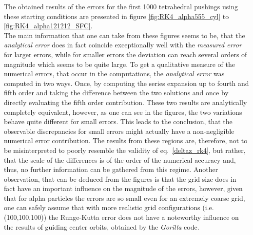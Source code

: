\documentclass[./main.tex]{subfiles}
\begin{document}
The obtained results of the errors for the first 1000 tetrahedral pushings using these starting conditions are presented in figure \ref{fig:RK4_alpha555_cyl} to \ref{fig:RK4_alpha121212_SFC}.\\
The main information that one can take from these figures seems to be, that the \textit{analytical error} does in fact coincide exceptionally well with the \textit{measured error} for larger errors, while for smaller errors the deviation can reach several orders of magnitude which seems to be quite large. To get a qualitative measure of the numerical errors, that occur in the computations, the \textit{analytical error} was computed in two ways. Once, by computing the series expansion up to fourth and fifth order and taking the difference between the two solutions and once by directly evaluating the fifth order contribution. These two results are analytically completely equivalent, however, as one can see in the figures, the two variations behave quite different for small errors. This leads to the conclusion, that the observable discrepancies for small errors might actually have a non-negligible numerical error contribution. The results from these regions are, therefore, not to be misinterpreted to poorly resemble the validity of eq.~\eqref{deltaz_rk4}, but rather, that the scale of the differences is of the order of the numerical accuracy and, thus, no further information can be gathered from this regime. Another observation, that can be deduced from the figures is that the grid size does in fact have an important influence on the magnitude of the errors, however, given that for alpha particles the errors are so small even for an extremely coarse grid, one can safely assume that with more realistic grid configurations (i.e. (100,100,100)) the Runge-Kutta error does not have a noteworthy influence on the results of guiding center orbits, obtained by the \textit{Gorilla} code.
\end{document}
